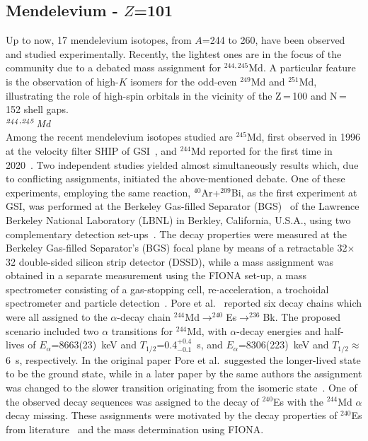 \subsection {Mendelevium - $Z$=101}\label{Md}

Up to now, 17 mendelevium isotopes, from $A$=244 to 260, have been observed and studied experimentally.
Recently, the lightest ones are in the focus of the community due to a debated mass assignment for $^{244,245}$Md. 
A particular feature is the observation of high-$K$ isomers for the odd-even $^{249}$Md and $^{251}$Md, illustrating the role of high-spin orbitals in the vicinity of the Z\,=\,100 and N\,=\,152 shell gaps.\\

{\it $^{\it244,245}$Md}\\ 
Among the recent mendelevium isotopes studied are $^{245}$Md, first observed in 1996 at the velocity filter SHIP of GSI~\cite{Ninov1996}, and $^{244}$Md reported for the first time in 2020~\cite{Pore2020,Khuyagbaatar2020}. 
Two independent studies yielded almost simultaneously results which, due to conflicting assignments, initiated the above-mentioned debate.
One of these experiments, employing the same reaction, $^{40}$Ar+$^{209}$Bi, as the first experiment at GSI, was performed at the Berkeley Gas-filled Separator (BGS)~\cite{Gregorich2013} of the Lawrence Berkeley National Laboratory (LBNL) in Berkley, California, U.S.A., using two complementary detection set-ups~\cite{Pore2020}. 
The decay properties were measured at the Berkeley Gas-filled Separator's (BGS) focal plane by means of a retractable 32$\times$32 double-sided silicon strip detector (DSSD), while a mass assignment was obtained in a separate measurement using the FIONA set-up, a mass spectrometer consisting of a gas-stopping cell, re-acceleration, a trochoidal spectrometer and particle detection~\cite{Gates2018}. 
Pore et al.~\cite{Pore2020} reported six decay chains which were all assigned to the $\alpha$-decay chain $^{244}$Md$ \rightarrow ^{240}$Es$ \rightarrow ^{236}$Bk. 
The proposed scenario included two $\alpha$ transitions for $^{244}$Md, with $\alpha$-decay energies and half-lives of $E_\alpha$=8663(23)~keV and $T_{1/2}$=0.4$^{+0.4}_{-0.1}$~s, and $E_\alpha$=8306(223)~keV and $T_{1/2}\approx$6~s, respectively. 
In the original paper Pore et al.~suggested the longer-lived state to be the ground state, while in a later paper by the same authors the assignment was changed to the slower transition originating from the isomeric state~\cite{Gates2022}. 
One of the observed decay sequences was assigned to the decay of $^{240}$Es with the $^{244}$Md $\alpha$ decay missing. 
These assignments were motivated by the decay properties of $^{240}$Es from literature~\cite{Konki2017} and the mass determination using FIONA.

